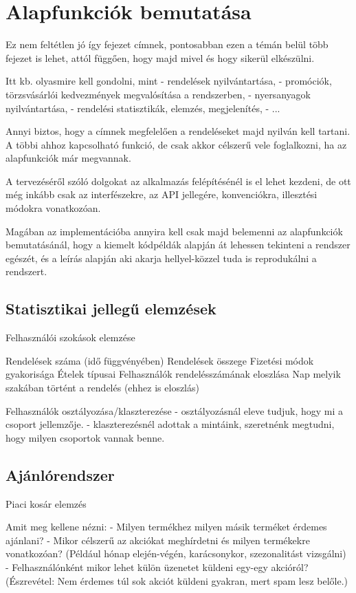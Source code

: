\chapter{Alapfunkciók bemutatása}

Ez nem feltétlen jó így fejezet címnek, pontosabban ezen a témán belül több fejezet is lehet, attól függően, hogy majd mivel és hogy sikerül elkészülni.

Itt kb. olyasmire kell gondolni, mint
- rendelések nyilvántartása,
- promóciók, törzsvásárlói kedvezmények megvalósítása a rendszerben,
- nyersanyagok nyilvántartása,
- rendelési statisztikák, elemzés, megjelenítés,
- ...

Annyi biztos, hogy a címnek megfelelően a rendeléseket majd nyilván kell tartani. A többi ahhoz kapcsolható funkció, de csak akkor célszerű vele foglalkozni, ha az alapfunkciók már megvannak.

A tervezéséről szóló dolgokat az alkalmazás felépítésénél is el lehet kezdeni, de ott még inkább csak az interfészekre, az API jellegére, konvenciókra, illesztési módokra vonatkozóan.

Magában az implementációba annyira kell csak majd belemenni az alapfunkciók bemutatásánál, hogy a kiemelt kódpéldák alapján át lehessen tekinteni a rendszer egészét, és a leírás alapján aki akarja hellyel-közzel tuda is reprodukálni a rendszert.

\section{Statisztikai jellegű elemzések}

Felhasználói szokások elemzése

Rendelések száma (idő függvényében)
Rendelések összege
Fizetési módok gyakorisága
Ételek típusai
Felhasználók rendelésszámának eloszlása
Nap melyik szakában történt a rendelés (ehhez is eloszlás)

Felhasználók osztályozása/klaszterezése
- osztályozásnál eleve tudjuk, hogy mi a csoport jellemzője.
- klaszterezésnél adottak a mintáink, szeretnénk megtudni, hogy milyen csoportok vannak benne.

\section{Ajánlórendszer}

Piaci kosár elemzés

Amit meg kellene nézni:
- Milyen termékhez milyen másik terméket érdemes ajánlani?
- Mikor célszerű az akciókat meghírdetni és milyen termékekre vonatkozóan? (Például hónap elején-végén, karácsonykor, szezonalitást vizsgálni)
- Felhasználónként mikor lehet külön üzenetet küldeni egy-egy akcióról? (Észrevétel: Nem érdemes túl sok akciót küldeni gyakran, mert spam lesz belőle.)
